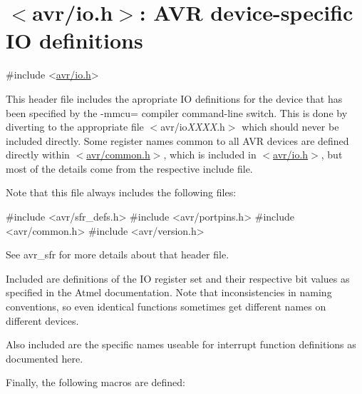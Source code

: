 \hypertarget{group__avr__io}{}\section{$<$avr/io.h$>$\+: A\+VR device-\/specific IO definitions}
\label{group__avr__io}

\begin{DoxyCode}
\textcolor{preprocessor}{#include <\hyperlink{io_8h}{avr/io.h}>} 
\end{DoxyCode}


This header file includes the apropriate IO definitions for the device that has been specified by the {\ttfamily -\/mmcu=} compiler command-\/line switch. This is done by diverting to the appropriate file {\ttfamily $<$avr/io}{\itshape X\+X\+XX}{\ttfamily .h$>$} which should never be included directly. Some register names common to all A\+VR devices are defined directly within {\ttfamily $<$\hyperlink{common_8h_source}{avr/common.\+h}$>$}, which is included in {\ttfamily $<$\hyperlink{io_8h}{avr/io.\+h}$>$}, but most of the details come from the respective include file.

Note that this file always includes the following files\+: 
\begin{DoxyCode}
\textcolor{preprocessor}{#include <avr/sfr\_defs.h>}
\textcolor{preprocessor}{#include <avr/portpins.h>}
\textcolor{preprocessor}{#include <avr/common.h>}
\textcolor{preprocessor}{#include <avr/version.h>}
\end{DoxyCode}
 See avr\+\_\+sfr for more details about that header file.

Included are definitions of the IO register set and their respective bit values as specified in the Atmel documentation. Note that inconsistencies in naming conventions, so even identical functions sometimes get different names on different devices.

Also included are the specific names useable for interrupt function definitions as documented here.

Finally, the following macros are defined\+:


